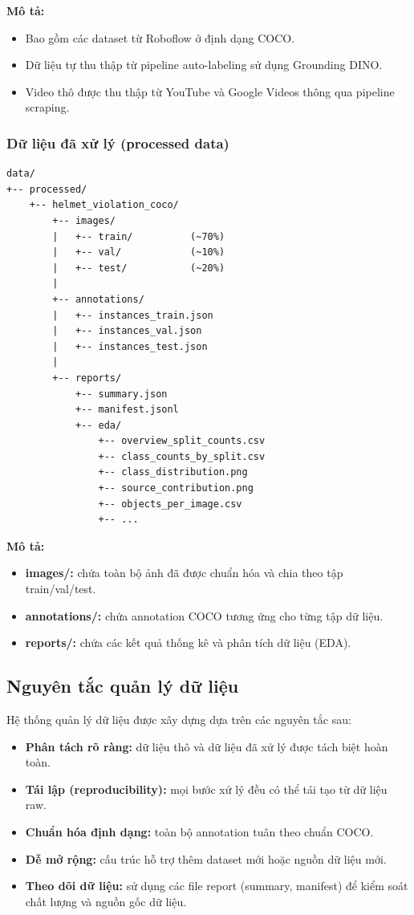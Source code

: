 \textbf{Mô tả:}
\begin{itemize}
    \item Bao gồm các dataset từ Roboflow ở định dạng COCO.
    \item Dữ liệu tự thu thập từ pipeline auto-labeling sử dụng Grounding DINO.
    \item Video thô được thu thập từ YouTube và Google Videos thông qua pipeline scraping.
\end{itemize}

\subsubsection{Dữ liệu đã xử lý (processed data)}

\begin{verbatim}
data/
+-- processed/
    +-- helmet_violation_coco/
        +-- images/
        |   +-- train/          (~70%)
        |   +-- val/            (~10%)
        |   +-- test/           (~20%)
        |
        +-- annotations/
        |   +-- instances_train.json
        |   +-- instances_val.json
        |   +-- instances_test.json
        |
        +-- reports/
            +-- summary.json
            +-- manifest.jsonl
            +-- eda/
                +-- overview_split_counts.csv
                +-- class_counts_by_split.csv
                +-- class_distribution.png
                +-- source_contribution.png
                +-- objects_per_image.csv
                +-- ...
\end{verbatim}

\textbf{Mô tả:}
\begin{itemize}
    \item \textbf{images/:} chứa toàn bộ ảnh đã được chuẩn hóa và chia theo tập train/val/test.
    \item \textbf{annotations/:} chứa annotation COCO tương ứng cho từng tập dữ liệu.
    \item \textbf{reports/:} chứa các kết quả thống kê và phân tích dữ liệu (EDA).
\end{itemize}

\subsection{Nguyên tắc quản lý dữ liệu}

Hệ thống quản lý dữ liệu được xây dựng dựa trên các nguyên tắc sau:

\begin{itemize}
    \item \textbf{Phân tách rõ ràng:} dữ liệu thô và dữ liệu đã xử lý được tách biệt hoàn toàn.
    \item \textbf{Tái lập (reproducibility):} mọi bước xử lý đều có thể tái tạo từ dữ liệu raw.
    \item \textbf{Chuẩn hóa định dạng:} toàn bộ annotation tuân theo chuẩn COCO.
    \item \textbf{Dễ mở rộng:} cấu trúc hỗ trợ thêm dataset mới hoặc nguồn dữ liệu mới.
    \item \textbf{Theo dõi dữ liệu:} sử dụng các file report (summary, manifest) để kiểm soát chất lượng và nguồn gốc dữ liệu.
\end{itemize}